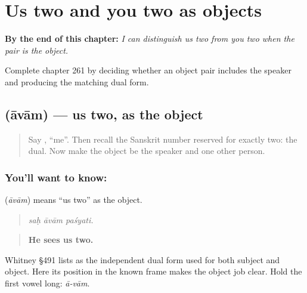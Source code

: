 
\chapter{Us two and you two as objects}
\label{ch:sa-us-two-you-two-objects}

\begin{chapteropening}
\textbf{By the end of this chapter:} \emph{I can distinguish us two from you two when the pair is the object.}

Complete chapter 261 by deciding whether an object pair includes the speaker and producing the matching dual form.
\end{chapteropening}

\section[\texorpdfstring{\sk{आवाम्} (āvām)}{आवाम् (āvām)}]{ (āvām) — us two, as the object}

\label{lesson:SA-C261-avam}



\begin{quote}
Say \textbf{}, “me”. Then recall the Sanskrit number reserved for exactly two: the dual. Now make the object be the speaker and one other person.
\end{quote}

\subsection*{You'll want to know: }
\textbf{} (\emph{āvām}) means “us two” as the object.

\begin{quote}
\textbf{  }
\end{quote}

\begin{quote}
\emph{saḥ āvām paśyati.}
\end{quote}

\begin{quote}
\textbf{He sees us two.}
\end{quote}

Whitney §491 lists \textbf{} as the independent dual form used for both subject and object. Here its position in the known frame makes the object job clear. Hold the first vowel long: \emph{ā-vām}.

